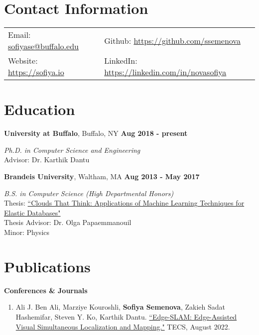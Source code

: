 \documentclass[margin,line]{res}
\begin{document}

\begin{resume}

\section{\sc Contact Information}
\vspace{.05in}
\begin{tabular}{@{}p{2.5in}p{4in}}
{ Email:}  \href{sofiyase@buffalo.edu}{sofiyase@buffalo.edu} &  { Github:} \href{https://github.com/ssemenova}{https://github.com/ssemenova}\\ 
{ Website:} \href{https://sofiya.io}{https://sofiya.io} & { LinkedIn:} \href{https://linkedin.com/in/novasofiya}{https://linkedin.com/in/novasofiya} \\ 
\end{tabular}


\section{\sc Education}
{\bf University at Buffalo}, Buffalo, NY   \hfill {\bf Aug 2018 - present}

\vspace{-.4cm}
{\em Ph.D. in Computer Science and Engineering} \\
Advisor: Dr. Karthik Dantu

{\bf Brandeis University}, Waltham, MA  \hfill {\bf Aug 2013 - May 2017}

\vspace{-.4cm}
{\em B.S. in Computer Science (High Departmental Honors)} \\
Thesis: \href{https://sofiya.io/media/thesis.pdf}{``Clouds That Think: Applications of Machine Learning Techniques for Elastic Databases"} \\
Thesis Advisor: Dr. Olga Papaemmanouil \\
Minor: Physics


\section{\sc Publications}

{\textbf{Conferences \& Journals}}

\begin{enumerate}
	\item Ali J. Ben Ali, Marziye Kouroshli, \textbf{Sofiya Semenova}, Zakieh Sadat Hashemifar, Steven Y. Ko, Karthik Dantu. \href{https://dl.acm.org/doi/10.1145/3561972}{``Edge-SLAM: Edge-Assisted Visual Simultaneous Localization and Mapping."} TECS, August 2022.
	

\end{enumerate}
\end{resume}
\end{document}

